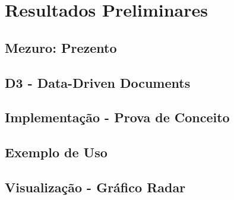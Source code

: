 \chapter{Resultados Preliminares}

\section{Mezuro: Prezento}


\section{D3 - Data-Driven Documents}

\section{Implementação - Prova de Conceito}

\section{Exemplo de Uso}


\section{Visualização - Gráfico Radar}
